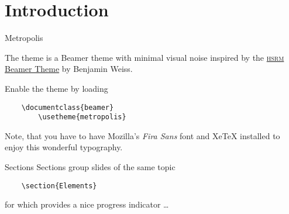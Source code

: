 \section[Introduction]{Introduction}

\begin{frame}[fragile]{Metropolis}
	
	The \themename theme is a Beamer theme with minimal visual noise
	inspired by the \href{https://github.com/hsrmbeamertheme/hsrmbeamertheme}{\textsc{hsrm} Beamer
		Theme} by Benjamin Weiss.
	
	Enable the theme by loading
	
	\begin{verbatim}    \documentclass{beamer}
		\usetheme{metropolis}\end{verbatim}
	
	Note, that you have to have Mozilla's \emph{Fira Sans} font and XeTeX
	installed to enjoy this wonderful typography.
\end{frame}

\begin{frame}[fragile]{Sections}
	Sections group slides of the same topic
	
	\begin{verbatim}    \section{Elements}\end{verbatim}
	
	for which \themename provides a nice progress indicator \ldots
	
\end{frame}